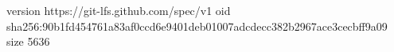 version https://git-lfs.github.com/spec/v1
oid sha256:90b1fd454761a83af0ccd6e9401deb01007adcdecc382b2967ace3cecbff9a09
size 5636
